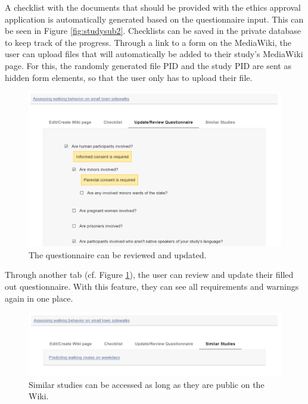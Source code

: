 \documentclass[10pt]{article}
\begin{document}
A checklist with the documents that should be provided with the ethics approval application is automatically generated based on the questionnaire input. This can be seen in Figure \ref{fig:studysub2}. Checklists can be saved in the private database to keep track of the progress. Through a link to a form on the MediaWiki, the user can upload files that will automatically be added to their study's MediaWiki page. For this, the randomly generated file PID and the study PID are sent as hidden form elements, so that the user only has to upload their file.  \\

\begin{figure}[H]
\centering
	\includegraphics[width=1\textwidth]{img/studysub3.png}
	\caption{The questionnaire can be reviewed and updated.}
	\label{fig:studysub3}
\end{figure}

Through another tab (cf. Figure \ref{fig:studysub3}), the user can review and update their filled out questionnaire. With this feature, they can see all requirements and warnings again in one place.\\

\begin{figure}[H]
\centering
	\includegraphics[width=1\textwidth]{img/studysub4.png}
	\caption{Similar studies can be accessed as long as they are public on the Wiki.}
	\label{fig:studysub4}
\end{figure}
\end{document}
